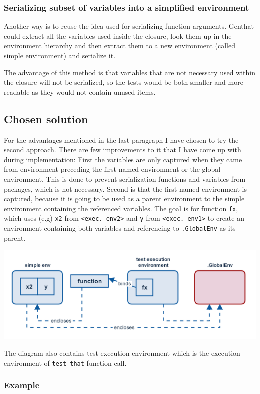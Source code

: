 \documentclass[thesis=B,english]{FITthesis}[2012/10/20]
\begin{document}
\subsubsection{Serializing subset of variables into a simplified environment}
Another way is to reuse the idea used for serializing function arguments. Genthat could extract all the variables used inside the closure, look them up in the environment hierarchy and then extract them to a new environment (called simple environment) and serialize it.

The advantage of this method is that variables that are not necessary used within the closure will not be serialized, so the tests would be both smaller and more readable as they would not contain unused items.

\subsection{Chosen solution}
For the advantages mentioned in the last paragraph I have chosen to try the second approach. There are few improvements to it that I have come up with during implementation: First the variables are only captured when they came from environment preceding the first named environment or the global environment. This is done to prevent serialization functions and variables from packages, which is not necessary. Second is that the first named environment is captured, because it is going to be used as a parent environment to the simple environment containing the referenced variables. The goal is for function \verb|fx|, which uses (e.g) \verb|x2| from \verb|<exec. env2>| and \verb|y| from \verb|<exec. env1>| to create an environment containing both variables and referencing to \verb|.GlobalEnv| as its parent. 

\includegraphics[width=\textwidth]{img/simple-env.png}

The diagram also contains test execution environment which is the execution environment of \verb|test_that| function call.

\subsubsection{Example}
\end{document}
